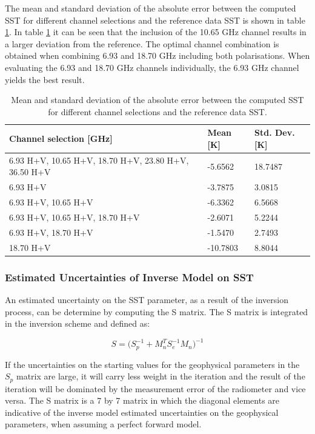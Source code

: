 \documentclass[11pt, a4paper]{article}
\begin{document}
The mean and standard deviation of the absolute error between the computed SST for different channel selections and the reference data SST is shown in table \ref{tab:task3b_1}. In table \ref{tab:task3b_1} it can be seen that the inclusion of the 10.65 GHz channel results in a larger deviation from the reference. The optimal channel combination is obtained when combining 6.93 and 18.70 GHz including both polarisations. When evaluating the 6.93 and 18.70 GHz channels individually, the 6.93 GHz channel yields the best result.
\newline 

\begin{table}[h!]
	\centering
	\begin{tabular}{@{}p{9cm}p{3cm}p{3cm}@{}}
		Channel selection [GHz] & Mean [K] & Std. Dev. [K] 
		\tabularnewline
		\midrule
		6.93 H+V, 10.65 H+V, 18.70 H+V, 23.80 H+V, 36.50 H+V & -5.6562 &  18.7487	\\
		6.93 H+V	& -3.7875	&  3.0815 \\
		6.93 H+V, 10.65 H+V	& -6.3362	&  6.5668 \\
		6.93 H+V, 10.65 H+V, 18.70 H+V	& -2.6071 &	5.2244	\\
		6.93 H+V, 18.70 H+V	& -1.5470 & 2.7493	\\
		18.70 H+V	& -10.7803 & 8.8044 \\
		\midrule
	\end{tabular}
	\caption{Mean and standard deviation of the absolute error between the computed SST for different channel selections and the reference data SST.}
	\label{tab:task3b_1}
\end{table}


\subsubsection{Estimated Uncertainties of Inverse Model on SST}
An estimated uncertainty on the SST parameter, as a result of the inversion process, can be determine by computing the S matrix. The S matrix is integrated in the inversion scheme and defined as: 

\begin{equation*}
S =
\Big(S_p^{-1} + M_n^T S_e^{-1} M_n \Big)^{-1}  
\label{S_matrix}
\end{equation*}

If the uncertainties on the starting values for the geophysical parameters in the \(S_p\) matrix are large, it will carry less weight in the iteration and the result of the iteration will be dominated by the measurement error of the radiometer and vice versa. The S matrix is a 7 by 7 matrix in which the diagonal elements are indicative of the inverse model estimated uncertainties on the geophysical parameters, when assuming a perfect forward model. 
\newline
\end{document}
